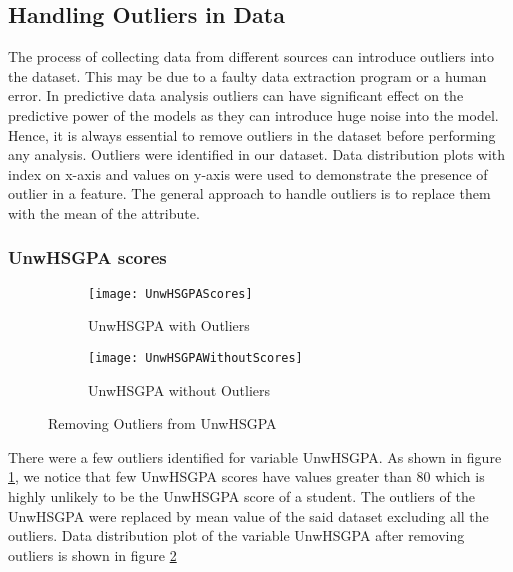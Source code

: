 \documentclass[11pt,openright]{report}
\begin{document}
\subsection {Handling Outliers in Data}

The process of collecting data from different sources can introduce outliers into the dataset. This may be due to a faulty data extraction program or a human error. In predictive data analysis outliers can have significant effect on the predictive power of the models as they can introduce huge noise into the model. Hence, it is always essential to remove outliers in the dataset before performing any analysis. Outliers were identified in our dataset. Data distribution plots with index on x-axis and values on y-axis were used to demonstrate the presence of outlier in a feature. The general approach to handle outliers is to replace them with the mean of the attribute.


\subsubsection{UnwHSGPA scores}

\begin{figure}
\centering
    \begin{subfigure}[b]{0.55\textwidth}            
            \texttt{[image: UnwHSGPAScores]}
            \caption{UnwHSGPA with Outliers}
            \label{fig:UnwHSGPA-with-outliers}
    \end{subfigure}%
    \begin{subfigure}[b]{0.55\textwidth}
            \centering
            \texttt{[image: UnwHSGPAWithoutScores]}
            \caption{UnwHSGPA without Outliers}
            \label{fig:UnwHSGPA-No-outliers}
    \end{subfigure}
    \caption{Removing Outliers from UnwHSGPA}\label{fig:unwHSGPA}
\end{figure}

 There were a few outliers identified for variable UnwHSGPA. As shown in figure \ref{fig:UnwHSGPA-with-outliers}, we notice that few UnwHSGPA scores have values greater than 80 which is highly unlikely to be the UnwHSGPA score of a student. The outliers of the UnwHSGPA were replaced by mean value of the said dataset excluding all the outliers. Data distribution plot of the variable UnwHSGPA after removing outliers is shown in figure \ref{fig:UnwHSGPA-No-outliers}
\end{document}
